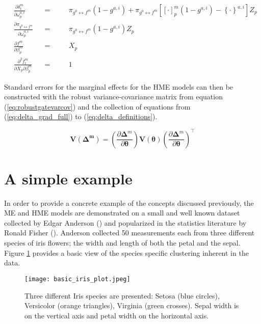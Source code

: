\documentclass[12pt]{article}
\newcommand{\gateprod}[2]{\pi_{#1 \longleftrightarrow #2}}
\begin{document}
\begin{subequations} \label{eq:delta_definitions}
\begin{alignat}{3}
&\frac{\partial \delta^{m}_{t}}{\partial \omega^{a,i}_{p}}            &&=&\quad& \gateprod{g^{0}}{f^{m}} (1 - g^{a,i})  +  \gateprod{g^{0}}{f^{m}} \left[ \left[\cdot \right]^{m}_p  (1 - g^{a,i}) - \left\{ \cdot \right\}^{a,i}  \right] Z_{p} \label{eq:delta_gate_partial}\\
&\frac{\partial \gateprod{g^{0}}{f^{m}}}{\partial \omega^{a,i}_{p}}   &&=&\quad& \gateprod{g^{0}}{f^{m}} (1 - g^{a,i}) Z_{p} \\
&\frac{\partial f^{m}}{\partial \beta^{m}_{p}}                        &&=&\quad& X_{p} \\
&\frac{\partial^{2} f^{m}_{t}}{\partial X_{p} \partial \beta^{m}_{p}} &&=&\quad& 1
\end{alignat}
\end{subequations}


Standard errors for the marginal effects for the HME models can then be
constructed with the robust variance-covariance matrix from equation
(\ref{eq:robustgatevarcov}) and the collection of equations from
(\ref{eq:delta_grad_full}) to (\ref{eq:delta_definitions}).


\begin{equation}
    \boldsymbol{V}(\boldsymbol{\Delta^{m}}) = \left(\frac{\partial \boldsymbol{\Delta}^{m}}{\partial \boldsymbol{\theta}} \right) \boldsymbol{V}(\boldsymbol{\theta})  \left(\frac{\partial \boldsymbol{\Delta}^{m}}{\partial \boldsymbol{\theta}} \right)^{\top}
\end{equation}


\section{A simple example} \label{sec:SimpleExample}

In order to provide a concrete example of the concepts discussed previously,
the ME and HME models are demonstrated on a small and well known dataset
collected by Edgar Anderson (\cite{Anderson1936}) and popularized in the
statistics literature by Ronald Fisher (\cite{Fisher1936}). Anderson collected
50 measurements each from three different species of iris flowers; the width and
length of both the petal and the sepal. Figure \ref{fig:Iris_dataset} provides a
basic view of the species specific clustering inherent in the data.

\begin{figure}[!ht]
  \texttt{[image: basic\_iris\_plot.jpeg]}
  \caption{Three different Iris species are presented: Setosa
  (blue circles), Versicolor (orange triangles), Virginia (green crosses).
  Sepal width is on the vertical axis and petal width on the horizontal
  axis.}
  \label{fig:Iris_dataset}
\end{figure}
\end{document}
